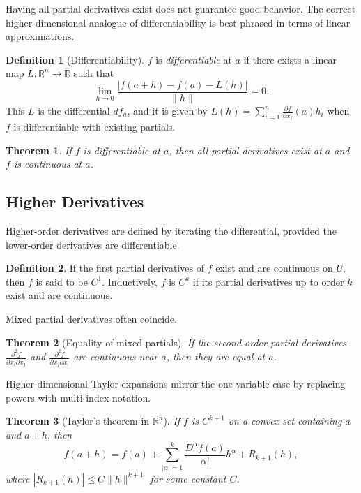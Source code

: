 \documentclass{article}
\theoremstyle{definition}
\newtheorem{definition}{Definition}[section]
\theoremstyle{plain}
\newtheorem{theorem}{Theorem}[section]
\begin{document}
Having all partial derivatives exist does not guarantee good behavior. The correct higher-dimensional analogue of differentiability is best phrased in terms of linear approximations.
\begin{definition}[Differentiability]
	$f$ is \emph{differentiable} at $a$ if there exists a linear map $L\colon \mathbb{R}^n \to \mathbb{R}$ such that
	\[
		\lim_{h\to 0} \frac{|f(a+h) - f(a) - L(h)|}{\|h\|} = 0.
	\]
	This $L$ is the differential $df_a$, and it is given by $L(h)=\sum_{i=1}^n \frac{\partial f}{\partial x_i}(a) h_i$ when $f$ is differentiable with existing partials.
\end{definition}

\begin{theorem}\label{thm:rectangles-open}
	If $f$ is differentiable at $a$, then all partial derivatives exist at $a$ and $f$ is continuous at $a$.
\end{theorem}

\subsection{Higher Derivatives}\label{subsec:partial-higher}
Higher-order derivatives are defined by iterating the differential, provided the lower-order derivatives are differentiable.
\begin{definition}
	If the first partial derivatives of $f$ exist and are continuous on $U$, then $f$ is said to be $C^1$. Inductively, $f$ is $C^k$ if its partial derivatives up to order $k$ exist and are continuous.
\end{definition}

Mixed partial derivatives often coincide.
\begin{theorem}[Equality of mixed partials]
	If the second-order partial derivatives $\frac{\partial^2 f}{\partial x_i \partial x_j}$ and $\frac{\partial^2 f}{\partial x_j \partial x_i}$ are continuous near $a$, then they are equal at $a$.
\end{theorem}

Higher-dimensional Taylor expansions mirror the one-variable case by replacing powers with multi-index notation.
\begin{theorem}[Taylor’s theorem in $\mathbb{R}^n$]
	If $f$ is $C^{k+1}$ on a convex set containing $a$ and $a+h$, then
	\[
		f(a+h) = f(a) + \sum_{|\alpha|=1}^k \frac{D^\alpha f(a)}{\alpha!} h^\alpha + R_{k+1}(h),
	\]
	where $|R_{k+1}(h)| \le C \|h\|^{k+1}$ for some constant $C$.
	\end{theorem}
\end{document}
